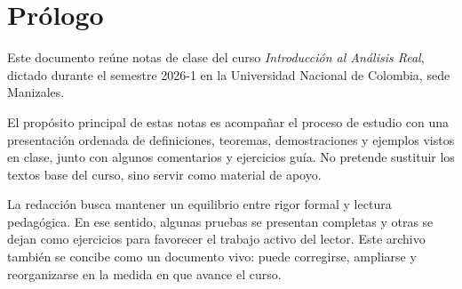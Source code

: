 \chapter*{Prólogo}

Este documento reúne notas de clase del curso \textit{Introducción al Análisis Real},
dictado durante el semestre 2026-1 en la Universidad Nacional de Colombia,
sede Manizales.

El propósito principal de estas notas es acompañar el proceso de estudio con una
presentación ordenada de definiciones, teoremas, demostraciones y ejemplos vistos
en clase, junto con algunos comentarios y ejercicios guía. No pretende sustituir
los textos base del curso, sino servir como material de apoyo.

La redacción busca mantener un equilibrio entre rigor formal y lectura pedagógica.
En ese sentido, algunas pruebas se presentan completas y otras se dejan como
ejercicios para favorecer el trabajo activo del lector. Este archivo también se
concibe como un documento vivo: puede corregirse, ampliarse y reorganizarse en
la medida en que avance el curso.

